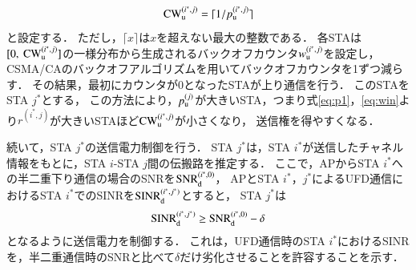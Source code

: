 \documentclass[master]{kuisthesis}		%
\begin{document}
			\begin{equation}
				{\rm CW}^{(i^*,j)}_{\rm u} = \lceil 1/p_{\rm u}^{(i^*,j)} \rceil
			\end{equation}
			と設定する．
			ただし，$\lceil x \rceil$は$x$を超えない最大の整数である．
			各STAは$[0,\ {\rm CW}^{(i^*,j)}_{\rm u}]$の一様分布から生成されるバックオフカウンタ$w_{\rm u}^{(i^*,j)}$を設定し，
			CSMA/CAのバックオフアルゴリズムを用いてバックオフカウンタを1ずつ減らす．
			その結果，最初にカウンタが0となったSTAが上り通信を行う．
			このSTAをSTA $j^*$とする，
			この方法により，$p_{\rm u}^{(j)}$が大きいSTA，つまり式\eqref{eq:p1}，\eqref{eq:win}より$r^{(i^*,j)}$が大きいSTAほど${\rm CW}^{(i^*,j)}_{\rm u}$が小さくなり，
			送信権を得やすくなる．
			\par
			続いて，STA $j^*$の送信電力制御を行う．
			STA $j^*$は，STA $i^*$が送信したチャネル情報をもとに，STA $i$-STA $j$間の伝搬路を推定する．
			ここで，APからSTA $i^*$への半二重下り通信の場合のSNRを${\rm SNR}_{\rm d}^{(i^*,0)}$，
			APとSTA $i^*$，$j^*$によるUFD通信におけるSTA $i^*$でのSINRを${\rm SINR}_{\rm d}^{(i^*,j^*)}$とすると，
			STA $j^*$は
			\begin{equation}
				{\rm SINR}_{\rm d}^{(i^*,j^*)} \geq {\rm SNR}_{\rm d}^{(i^*,0)} -\delta
			\end{equation}
			となるように送信電力を制御する．
			これは，UFD通信時のSTA $i^*$におけるSINRを，半二重通信時のSNRと比べて$\delta$だけ劣化させることを許容することを示す．
\end{document}
